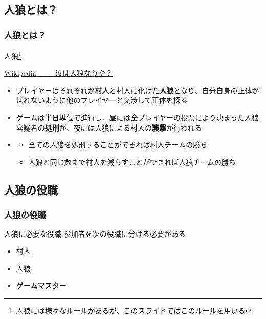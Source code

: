 \subsection{人狼とは？}
\begin{frame}[fragile]
  \frametitle{人狼とは？}

  \begin{exampleblock}{人狼\footnote[frame]{人狼には様々なルールがあるが、このスライドではこのルールを用いる}}
    \begin{shadequote}[r]{\scriptsize \href{https://ja.wikipedia.org/wiki/\%E6\%B1\%9D\%E3\%81\%AF\%E4\%BA\%BA\%E7\%8B\%BC\%E3\%81\%AA\%E3\%82\%8A\%E3\%82\%84\%3F}{Wikipedia ------ 汝は人狼なりや？}}
      \begin{itemize}
        \item<2-> プレイヤーはそれぞれが\textbf{村人}と村人に化けた\textbf{人狼}となり、自分自身の正体がばれないように他のプレイヤーと交渉して正体を探る
        \item<3-> ゲームは半日単位で進行し、昼には全プレイヤーの投票により決まった人狼容疑者の\textbf{処刑}が、夜には人狼による村人の\textbf{襲撃}が行われる
        \item
          \begin{itemize}
            \item<4-> 全ての人狼を処刑することができれば村人チームの勝ち
            \item<5-> 人狼と同じ数まで村人を減らすことができれば人狼チームの勝ち
          \end{itemize}
      \end{itemize}
    \end{shadequote}
  \end{exampleblock}
\end{frame}

\subsection{人狼の役職}
\begin{frame}[fragile]
  \frametitle{人狼の役職}

  \begin{block}{人狼に必要な役職}
    参加者を次の役職に分ける必要がある
    \begin{itemize}
      \item<2-> 村人
      \item<3-> 人狼
      \item<4-> \textbf{ゲームマスター}
    \end{itemize}
  \end{block}

  \begin{center}
  \end{center}
\end{frame}

